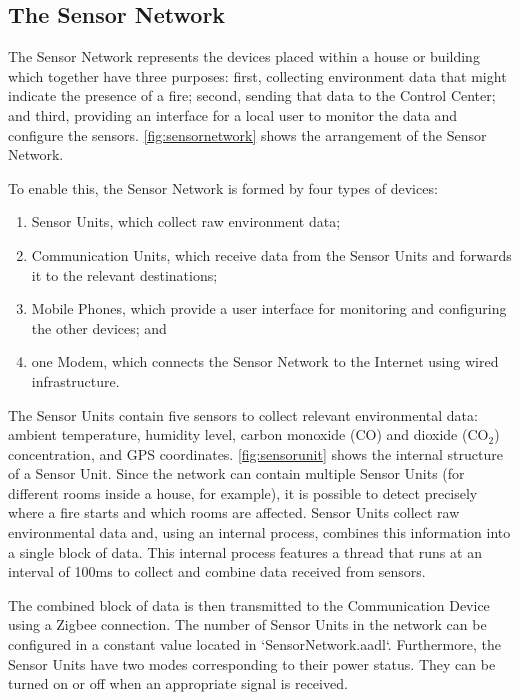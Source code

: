 \subsection{The Sensor Network}

The Sensor Network represents the devices placed within a house or building which together have three purposes: first, collecting environment data that might indicate the presence of a fire; second, sending that data to the Control Center; and third, providing an interface for a local user to monitor the data and configure the sensors. \autoref{fig:sensornetwork} shows the arrangement of the Sensor Network.

To enable this, the Sensor Network is formed by four types of devices:

\begin{enumerate}
	\item Sensor Units, which collect raw environment data;
	\item Communication Units, which receive data from the Sensor Units and forwards it to the relevant destinations;
	\item Mobile Phones, which provide a user interface for monitoring and configuring the other devices; and
	\item one Modem, which connects the Sensor Network to the Internet using wired infrastructure.
\end{enumerate}

The Sensor Units contain five sensors to collect relevant environmental data: ambient temperature, humidity level, carbon monoxide (CO) and dioxide (CO$_2$) concentration, and GPS coordinates.
\autoref{fig:sensorunit} shows the internal structure of a Sensor Unit. 
Since the network can contain multiple Sensor Units (for different rooms inside a house, for example), it is possible to detect precisely where a fire starts and which rooms are affected. 
Sensor Units collect raw environmental data and, using an internal process, combines this information into a single block of data. 
This internal process features a thread that runs at an interval of 100ms to collect and combine data received from sensors.

The combined block of data is then transmitted to the Communication Device using a Zigbee connection. The number of Sensor Units in the network can be configured in a constant value located in `SensorNetwork.aadl`. Furthermore, the Sensor Units have two modes corresponding to their power status. They can be turned on or off when an appropriate signal is received.

